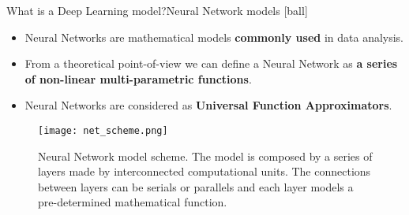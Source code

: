 \documentclass{standalone}
\begin{document}
\begin{frame}{What is a Deep Learning model?}{Neural Network models}
  [ball]

  \begin{itemize}
    \item Neural Networks are mathematical models \textbf{commonly used} in data analysis.

    \item From a theoretical point-of-view we can define a Neural Network as \textbf{a series of non-linear multi-parametric functions}.

    \item Neural Networks are considered as \textbf{Universal Function Approximators}.
  \end{itemize}

  \begin{figure}[hbp]
    \centering
    \texttt{[image: net\_scheme.png]}
    \caption{\scriptsize{Neural Network model scheme.
             The model is composed by a series of layers made by interconnected computational units.
             The connections between layers can be serials or parallels and each layer models a pre-determined mathematical function.
            }}
  \end{figure}

\end{frame}
\end{document}
